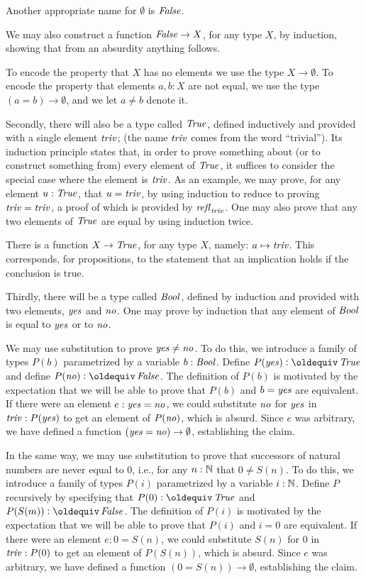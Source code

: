 Another appropriate name for $\emptyset$ is $\mathop{\mathit{False}}$.

We may also construct a function $\mathop{\mathit{False}} \to X$, for any type $X$, by induction, showing that from an absurdity anything follows.

To encode the property that $X$ has no elements we use the type $X \to \emptyset$.  To encode the property that elements $a,b:X$ are not equal,
we use the type $(a=b) \to \emptyset$, and we let $a \ne b$ denote it.

Secondly, there will also be a type called $\mathop{\mathit{True}}$, defined inductively and provided with a single element $\mathop{\mathit{triv}}$; (the name $\mathop{\mathit{triv}}$ comes from the word
  ``trivial'').  Its induction principle
states that, in order to prove something about (or to construct something from) every element of $\mathop{\mathit{True}}$, it suffices to consider the special
case where the element is $\mathop{\mathit{triv}}$.  As an example, we may prove, for any element $u : \mathop{\mathit{True}}$, that $u=\mathop{\mathit{triv}}$, by using induction to reduce
to proving $\mathop{\mathit{triv}}=\mathop{\mathit{triv}}$, a proof of which is provided by $\mathop{{\it refl}_{\mathop{\mathit{triv}}}}$.  One may also prove that any two elements of $\mathop{\mathit{True}}$ are equal by using induction twice.

There is a function $X \to \mathop{\mathit{True}}$, for any type $X$, namely: $a \mapsto \mathop{\mathit{triv}}$.  This corresponds, for propositions, to the statement that an
implication holds if the conclusion is true.

Thirdly, there will be a type called $\mathop{\mathit{Bool}}$, defined by induction and provided with two elements, $\mathop{\mathit{yes}}$ and $\mathop{\mathit{no}}$.  One may prove by induction
that any element of $\mathop{\mathit{Bool}}$ is equal to $\mathop{\mathit{yes}}$ or to $\mathop{\mathit{no}}$.

We may use substitution to prove $\mathop{\mathit{yes}} \ne \mathop{\mathit{no}}$.  To do this, we introduce a family of types $P(b)$ parametrized by a variable $b:\mathop{\mathit{Bool}}$.
Define $P(\yes) \defeq \true$ and define $P(\no) \defeq \false$.  The definition of $P(b)$ is motivated by the expectation that we will be able
to prove that $P(b)$ and $b = \mathop{\mathit{yes}}$ are equivalent.  If there were an element $e: \mathop{\mathit{yes}} = \mathop{\mathit{no}}$, we could substitute $\mathop{\mathit{no}}$ for $\mathop{\mathit{yes}}$ in $\mathop{\mathit{triv}} :
P (\mathop{\mathit{yes}})$ to get an element of $P(\mathop{\mathit{no}})$, which is absurd.  Since $e$ was arbitrary, we have defined a function $(\mathop{\mathit{yes}}=\mathop{\mathit{no}}) \to \emptyset$,
establishing the claim.

In the same way, we may use substitution to prove that successors of natural numbers are never equal to $0$, i.e., for any $n:\mathbb{N}$ that $0 \ne
S(n)$.  To do this, we introduce a family of types $P(i)$ parametrized by a variable $i:\mathbb{N}$.  Define $P$ recursively by specifying that $P(0)
\defeq \true$ and $P(S(m)) \defeq \false$.  The definition of $P(i)$ is motivated by the expectation that we will be able to prove that $P(i)$
and $i = 0$ are equivalent.  If there were an element $e: 0 = S(n)$, we could substitute $S(n)$ for $0$ in $\mathop{\mathit{triv}} : P ( 0 )$ to get an element
of $P(S(n))$, which is absurd.  Since $e$ was arbitrary, we have defined a function $(0=S(n)) \to \emptyset$, establishing the claim.

